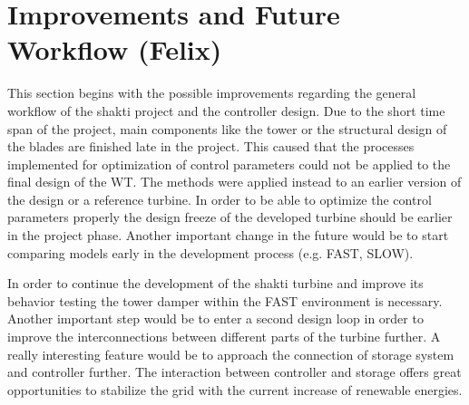 \section{Improvements and Future Workflow (Felix)}
This section begins with the possible improvements regarding the general workflow of the \gls{shakti} project and the controller design.
Due to the short time span of the project, main components like the tower or the structural design of the blades are finished late in the project.
This caused that the processes implemented for optimization of control parameters could not be applied to the final design of the \gls{WT}.
The methods were applied instead to an earlier version of the design or a reference turbine.
In order to be able to optimize the control parameters properly the design freeze of the developed turbine should be earlier in the project phase.
Another important change in the future would be to start comparing models early in the development process (e.g. FAST, SLOW).

In order to continue the development of the \gls{shakti} turbine and improve its behavior testing the tower damper within the FAST environment is necessary.
Another important step would be to enter a second design loop in order to improve the interconnections between different parts of the turbine further.
A really interesting feature would be to approach the connection of storage system and controller further.
The interaction between controller and storage offers great opportunities to stabilize the grid with the current increase of renewable energies.
